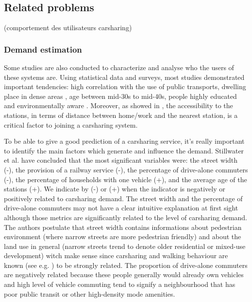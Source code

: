 \begin{bibunit}[ieeetr]
\subsection{Related problems}

\cite{leclerc_unraveling_2013} (comportement des utilisateurs carsharing)\\

\subsubsection{Demand estimation}
Some studies are also conducted to characterize and analyse who the users of these systems are.
Using statistical data and surveys, most studies demonstrated important tendencies: high correlation with the use of public transports, dwelling place in dense areas \cite{cervero_city_2003, millard_ball_car_sharing_2005, burkhardt_who_2006}, age between mid-30s to mid-40s, people highly educated and environmentally aware \cite{costain_synopsis_2012, efthymiou_which_2012, millard_ball_car_sharing_2005, brook_carsharingstart_2004, lane_phillycarshare_2005, zheng_carsharing_2009}.
Moreover, as showed in \cite{costain_synopsis_2012, efthymiou_which_2012, zheng_carsharing_2009}, the accessibility to the stations, in terms of distance between home/work and the nearest station, is a critical factor to joining a carsharing system.

\medskip
To be able to give a good prediction of a carsharing service, it's really important to identify the main factors which generate and influence the demand.
Stillwater et al. \cite{stillwater_carsharing_2009} have concluded that the most significant variables were: the street width (-), the provision of a railway service (-), the percentage of drive-alone commuters (-), the percentage of households with one vehicle (+), and the average age of the stations (+).
We indicate by (-) or (+) when the indicator is negatively or positively related to carsharing demand.
The street width and the percentage of drive-alone commuters may not have a clear intuitive explanation at first sight although those metrics are significantly related to the level of carsharing demand.
The authors postulate that street width contains informations about pedestrian environment (where narrow streets are more pedestrian friendly) and about the land use in general (narrow streets trend to denote older residential or mixed-use development) witch make sense since carsharing and walking behaviour are known (see e.g. \cite{cervero_city_2003}) to be strongly related.
The proportion of drive-alone commuters are negatively related because these people generally would already own vehicles and high level of vehicle commuting tend to signify a neighbourhood that has poor public transit or other high-density mode amenities.


\end{bibunit}
